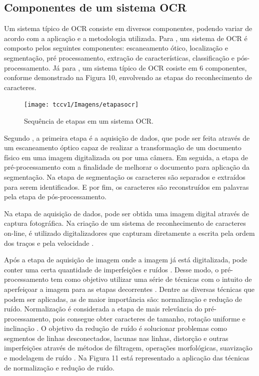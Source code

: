\subsection{Componentes de um sistema OCR}
Um sistema típico de OCR consiste em diversos componentes, podendo variar de
acordo com a aplicação e a metodologia utilizada. 
Para , um sistema de OCR é composto pelos seguintes componentes: escaneamento ótico, localização e segmentação, pré processamento, extração de características, classificação e pós-processamento. Já para , um sistema típico de OCR cosiste em 6 componentes, conforme demonstrado na Figura 10, envolvendo as etapas do reconhecimento de caracteres.



 \begin{figure}[h]
	\centering
	\texttt{[image: tccv1/Imagens/etapasocr]} 
	\caption[Sequência de etapas em um sistema OCR.]{Sequência de etapas em um sistema OCR.}
	\label{fig:tux_laplace}
\end{figure}

Segundo , a primeira etapa é a aquisição de dados, que pode ser feita através de um escaneamento óptico capaz de realizar a transformação de um documento físico em uma imagem digitalizada ou por uma câmera. Em seguida, a etapa de pré-processamento com a finalidade de melhorar o documento para aplicação da segmentação. Na etapa de segmentação os caracteres são separados e extraídos para serem identificados. E por fim, os caracteres são reconstruídos em palavras pela etapa de pós-processamento.

Na etapa de aquisição de dados, pode ser obtida uma imagem digital através de captura fotográfica. Na criação de um sistema de reconhecimento de caracteres on-line, é utilizado digitalizadores que capturam diretamente a escrita pela ordem dos traços e pela velocidade \cite{Goswami2013}.

Após a etapa de aquisição de imagem onde a imagem já está digitalizada, pode conter uma certa quantidade de imperfeições e ruídos \cite{Eikvil1993}. Desse modo, o pré-processamento tem como objetivo utilizar uma série de técnicas com o intuito de aperfeiçoar a imagem para as etapas decorrentes \cite{Goswami2013}. Dentre as diversas técnicas que podem ser aplicadas, as de maior importância são: normalização e redução de ruído. Normalização é considerada a etapa de mais relevância do pré-processamento, pois consegue obter caracteres de tamanho, rotação uniforme e inclinação \cite{Eikvil1993}. O objetivo da redução de ruído é solucionar problemas como segmentos de linhas desconectados, lacunas nas linhas, distorção e outras imperfeições através de métodos de filtragem, operações morfológicas, suavização e modelagem de ruído \cite{Goswami2013}. 
Na Figura 11 está representado a aplicação das técnicas de normalização e redução de ruído.


